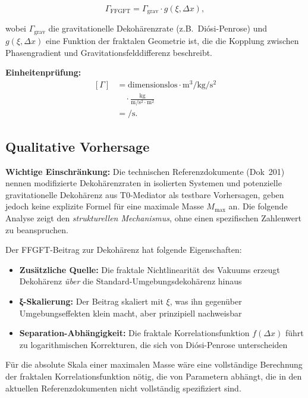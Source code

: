 	\begin{equation}
		\Gamma_{\text{FFGFT}} = \Gamma_{\text{grav}} \cdot g(\xi, \Delta x),
	\end{equation}
	
	wobei \(\Gamma_{\text{grav}}\) die gravitationelle Dekohärenzrate (z.B.\ Diósi-Penrose) und \(g(\xi, \Delta x)\) eine Funktion der fraktalen Geometrie ist, die die Kopplung zwischen Phasengradient und Gravitationsfelddifferenz beschreibt.
	
	\textbf{Einheitenprüfung:}
     \[
\begin{aligned}
	[\Gamma]
	&= \text{dimensionslos}
	\cdot \si{\meter\cubed\per\kilo\gram\per\second\squared} \\
	&\quad \cdot
	\frac{\si{\kilo\gram}}{
		\si{\meter\per\second\squared} \cdot \si{\meter^2}
	} \\
	&= \si{\per\second}.
\end{aligned}
\]
	
	\subsection*{Qualitative Vorhersage}
	
	\textbf{Wichtige Einschränkung:} Die technischen Referenzdokumente (Dok~201) nennen \glqq modifizierte Dekohärenzraten in isolierten Systemen\grqq{} und \glqq potenzielle gravitationelle Dekohärenz aus T0-Mediator\grqq{} als testbare Vorhersagen, geben jedoch keine explizite Formel für eine maximale Masse \(M_{\max}\) an. Die folgende Analyse zeigt den \emph{strukturellen Mechanismus}, ohne einen spezifischen Zahlenwert zu beanspruchen.
	
	Der FFGFT-Beitrag zur Dekohärenz hat folgende Eigenschaften:
	
	\begin{itemize}
		\item \textbf{Zusätzliche Quelle:} Die fraktale Nichtlinearität des Vakuums erzeugt Dekohärenz \emph{über} die Standard-Umgebungsdekohärenz hinaus
		\item \textbf{ξ-Skalierung:} Der Beitrag skaliert mit \(\xi\), was ihn gegenüber Umgebungseffekten klein macht, aber prinzipiell nachweisbar
		\item \textbf{Separation-Abhängigkeit:} Die fraktale Korrelationsfunktion \(f(\Delta x)\) führt zu logarithmischen Korrekturen, die sich von Diósi-Penrose unterscheiden
	\end{itemize}
	
	Für die absolute Skala einer maximalen Masse wäre eine vollständige Berechnung der fraktalen Korrelationsfunktion nötig, die von Parametern abhängt, die in den aktuellen Referenzdokumenten nicht vollständig spezifiziert sind.
	
